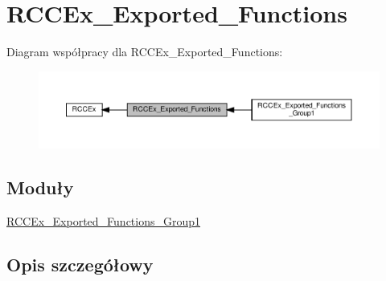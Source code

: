 \hypertarget{group___r_c_c_ex___exported___functions}{}\section{R\+C\+C\+Ex\+\_\+\+Exported\+\_\+\+Functions}
\label{group___r_c_c_ex___exported___functions}
Diagram współpracy dla R\+C\+C\+Ex\+\_\+\+Exported\+\_\+\+Functions\+:\nopagebreak
\begin{figure}[H]
\begin{center}
\leavevmode
\includegraphics[width=350pt]{group___r_c_c_ex___exported___functions}
\end{center}
\end{figure}
\subsection*{Moduły}
\begin{DoxyCompactItemize}
\item 
\hyperlink{group___r_c_c_ex___exported___functions___group1}{R\+C\+C\+Ex\+\_\+\+Exported\+\_\+\+Functions\+\_\+\+Group1}
\end{DoxyCompactItemize}


\subsection{Opis szczegółowy}
